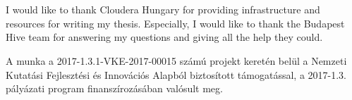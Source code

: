 \chapter*{\koszonetnyilvanitas}

I would like to thank Cloudera Hungary for providing infrastructure and resources for writing my thesis. Especially, I would like to thank the Budapest Hive team for answering my questions and giving all the help they could.

A munka a 2017-1.3.1-VKE-2017-00015 számú projekt keretén belül a Nemzeti Kutatási Fejlesztési és Innovációs Alapból biztosított támogatással, a 2017-1.3. pályázati program finanszírozásában valósult meg.